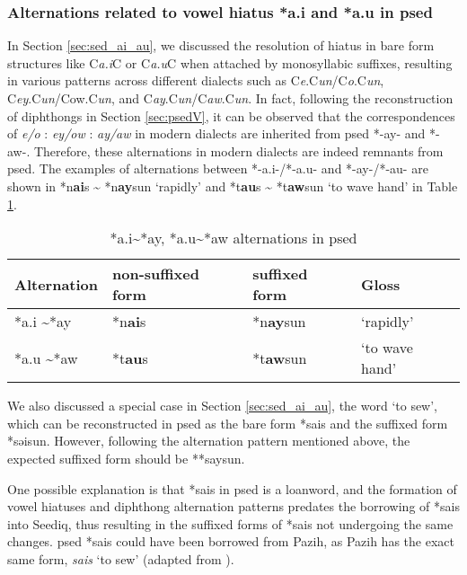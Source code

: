 \subsubsection{Alternations related to vowel hiatus *a.i and *a.u in \acl{psed}}

In Section \ref{sec:sed_ai_au}, we discussed the resolution of hiatus in bare form structures like C\textit{a.i}C or C\textit{a.u}C when attached by monosyllabic suffixes, resulting in various patterns across different dialects such as C\textit{e}.C\textit{un}/C\textit{o}.C\textit{un}, C\textit{ey}.C\textit{un}/Cow.C\textit{un}, and C\textit{ay}.C\textit{un}/C\textit{aw}.C\textit{un}. In fact, following the reconstruction of diphthongs in Section \ref{sec:psedV}, it can be observed that the correspondences of \textit{e/o} : \textit{ey/ow} : \textit{ay/aw} in modern dialects are inherited from \acl{psed} *-ay- and *-aw-. Therefore, these alternations in modern dialects are indeed remnants from \acl{psed}. The examples of alternations between *-a.i-/*-a.u- and *-ay-/*-au- are shown in *n\textbf{ai}s \~{} *n\textbf{ay}sun `rapidly' and *t\textbf{au}s \~{} *t\textbf{aw}sun `to wave hand' in Table \ref{tab:psed_ai_au}.

\begin{table}[!htbp]
\centering
\caption{*a.i\~{}*ay, *a.u\~{}*aw alternations in \acl{psed}}
\label{tab:psed_ai_au}
\begin{tabular}{llll}
\hline
Alternation        & non-suffixed form    & suffixed form & Gloss     \\ \hline
*a.i \~{ }*ay      & *n\textbf{ai}s & *n\textbf{ay}sun     & `rapidly' \\
*a.u \~{ }*aw      & *t\textbf{au}s & *t\textbf{aw}sun     & `to wave hand'   \\ \hline
\end{tabular}
\end{table}

We also discussed a special case in Section \ref{sec:sed_ai_au}, the word `to sew', which can be reconstructed in \acl{psed} as the bare form *sais and the suffixed form *səisun. However, following the alternation pattern mentioned above, the expected suffixed form should be **saysun.

One possible explanation is that *sais in \acl{psed} is a loanword, and the formation of vowel hiatuses and diphthong alternation patterns predates the borrowing of *sais into Seediq, thus resulting in the suffixed forms of *sais not undergoing the same changes. \acl{psed} *sais could have been borrowed from Pazih, as Pazih has the exact same form, \textit{sais} `to sew' (adapted from \cite{liandtsuchida2001paz}).

